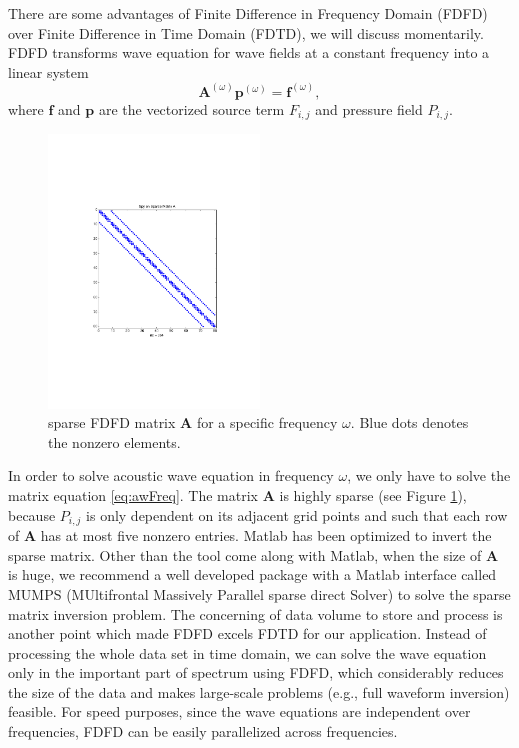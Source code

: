 \documentclass[11pt]{article}
\newcommand{\bA}{\boldsymbol{A}}
\newcommand{\bff}{\boldsymbol{f}}
\newcommand{\bp}{\boldsymbol{p}}
\theoremstyle{plain}
\theoremstyle{definition}
\theoremstyle{remark}
\numberwithin{equation}{section}
\begin{document}
There are some advantages of Finite Difference in Frequency Domain (FDFD) over Finite Difference in Time Domain (FDTD), we will discuss momentarily. FDFD transforms wave equation for wave fields at a constant frequency into a linear system 
\begin{equation}\label{eq:awFreq}
\bA^{(\omega)}\bp^{(\omega)} = \bff^{(\omega)},
\end{equation}
where $\bff$ and $\bp$ are the vectorized source term $F_{i,j}$ and pressure field $P_{i,j}$.
\begin{figure}[htbp]
\centering
\includegraphics[width=0.5\textwidth]{Fig/FDFDMatrixA.pdf}
\caption{sparse FDFD matrix $\bA$ for a specific frequency $\omega$. Blue dots denotes the nonzero elements.}
\label{fig:SparseA}
\end{figure}

In order to solve acoustic wave equation in frequency $\omega$, we only have to solve the matrix equation \eqref{eq:awFreq}. The 
  matrix $\bA$ is highly sparse (see Figure \ref{fig:SparseA}), because $P_{i,j}$ is only dependent on its adjacent grid points and such that each row of $\bA$ has at most five nonzero entries.
  Matlab has been optimized to invert the sparse matrix. Other than the tool come along with Matlab, when the size of $\bA$ is huge, we recommend a well developed package with a Matlab interface called MUMPS (MUltifrontal Massively Parallel sparse direct Solver) to solve the sparse matrix inversion problem. 
 The concerning of data volume to store and process is another point which made FDFD excels FDTD for our application. Instead of processing the whole data set in time domain, we can solve the wave equation only in the important part of spectrum using FDFD, which considerably reduces the size of the data and makes large-scale problems (e.g., full waveform inversion) feasible. For speed purposes, since the wave equations are independent over frequencies, FDFD can be easily parallelized across frequencies.
\end{document}

